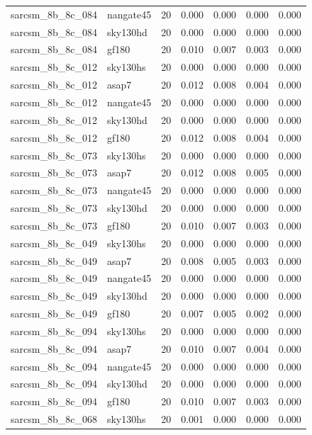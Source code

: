 \begin{tabular}{llrrrrr}
sarcsm\_8b\_8c\_084 & nangate45 & 20 & 0.000 & 0.000 & 0.000 & 0.000 \\
sarcsm\_8b\_8c\_084 & sky130hd & 20 & 0.000 & 0.000 & 0.000 & 0.000 \\
sarcsm\_8b\_8c\_084 & gf180 & 20 & 0.010 & 0.007 & 0.003 & 0.000 \\
sarcsm\_8b\_8c\_012 & sky130hs & 20 & 0.000 & 0.000 & 0.000 & 0.000 \\
sarcsm\_8b\_8c\_012 & asap7 & 20 & 0.012 & 0.008 & 0.004 & 0.000 \\
sarcsm\_8b\_8c\_012 & nangate45 & 20 & 0.000 & 0.000 & 0.000 & 0.000 \\
sarcsm\_8b\_8c\_012 & sky130hd & 20 & 0.000 & 0.000 & 0.000 & 0.000 \\
sarcsm\_8b\_8c\_012 & gf180 & 20 & 0.012 & 0.008 & 0.004 & 0.000 \\
sarcsm\_8b\_8c\_073 & sky130hs & 20 & 0.000 & 0.000 & 0.000 & 0.000 \\
sarcsm\_8b\_8c\_073 & asap7 & 20 & 0.012 & 0.008 & 0.005 & 0.000 \\
sarcsm\_8b\_8c\_073 & nangate45 & 20 & 0.000 & 0.000 & 0.000 & 0.000 \\
sarcsm\_8b\_8c\_073 & sky130hd & 20 & 0.000 & 0.000 & 0.000 & 0.000 \\
sarcsm\_8b\_8c\_073 & gf180 & 20 & 0.010 & 0.007 & 0.003 & 0.000 \\
sarcsm\_8b\_8c\_049 & sky130hs & 20 & 0.000 & 0.000 & 0.000 & 0.000 \\
sarcsm\_8b\_8c\_049 & asap7 & 20 & 0.008 & 0.005 & 0.003 & 0.000 \\
sarcsm\_8b\_8c\_049 & nangate45 & 20 & 0.000 & 0.000 & 0.000 & 0.000 \\
sarcsm\_8b\_8c\_049 & sky130hd & 20 & 0.000 & 0.000 & 0.000 & 0.000 \\
sarcsm\_8b\_8c\_049 & gf180 & 20 & 0.007 & 0.005 & 0.002 & 0.000 \\
sarcsm\_8b\_8c\_094 & sky130hs & 20 & 0.000 & 0.000 & 0.000 & 0.000 \\
sarcsm\_8b\_8c\_094 & asap7 & 20 & 0.010 & 0.007 & 0.004 & 0.000 \\
sarcsm\_8b\_8c\_094 & nangate45 & 20 & 0.000 & 0.000 & 0.000 & 0.000 \\
sarcsm\_8b\_8c\_094 & sky130hd & 20 & 0.000 & 0.000 & 0.000 & 0.000 \\
sarcsm\_8b\_8c\_094 & gf180 & 20 & 0.010 & 0.007 & 0.003 & 0.000 \\
sarcsm\_8b\_8c\_068 & sky130hs & 20 & 0.001 & 0.000 & 0.000 & 0.000 \\

\end{tabular}
